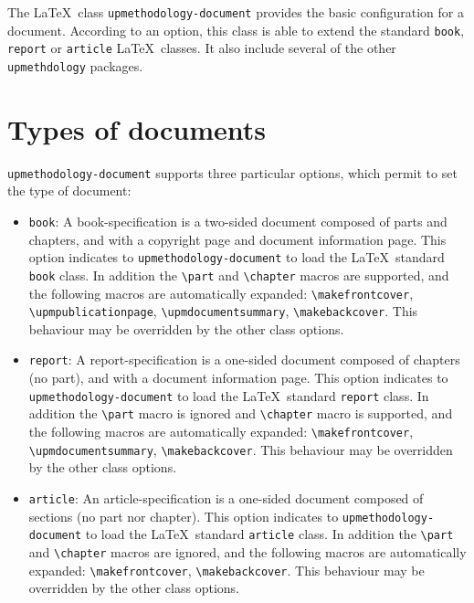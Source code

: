 \documentclass[book]{upmethodology-document}
\begin{document}
The \LaTeX\ class \texttt{upmethodology-document} provides the basic configuration for a document. According to an option, this class is able to extend the standard \texttt{book}, \texttt{report} or \texttt{article} \LaTeX\ classes. It also include several of the other \texttt{upmethdology} packages.

\section{Types of documents}\label{section:documentclass:doctype}

\texttt{upmethodology-document} supports three particular options, which permit to set the type of document:
\begin{itemize}
\item \texttt{book}: A book-specification is a two-sided document composed of parts and chapters, and with a copyright page and document information page. This option indicates to \texttt{upmethodology-document} to load the \LaTeX\ standard \texttt{book} class. In addition the \texttt{{\textbackslash}part} and \texttt{{\textbackslash}chapter} macros are supported, and the following macros are automatically expanded: \texttt{{\textbackslash}makefrontcover}, \texttt{{\textbackslash}upmpublicationpage}, \texttt{{\textbackslash}upmdocumentsummary}, \texttt{{\textbackslash}makebackcover}. This behaviour may be overridden by the other class options.

\item \texttt{report}: A report-specification is a one-sided document composed of chapters (no part), and with a document information page. This option indicates to \texttt{upmethodology-document} to load the \LaTeX\ standard \texttt{report} class. In addition the \texttt{{\textbackslash}part} macro is ignored and \texttt{{\textbackslash}chapter} macro is supported, and the following macros are automatically expanded: \texttt{{\textbackslash}makefrontcover}, \texttt{{\textbackslash}upmdocumentsummary}, \texttt{{\textbackslash}makebackcover}. This behaviour may be overridden by the other class options.

\item \texttt{article}: An article-specification is a one-sided document composed of sections (no part nor chapter). This option indicates to \texttt{upmethodology-document} to load the \LaTeX\ standard \texttt{article} class. In addition the \texttt{{\textbackslash}part} and \texttt{{\textbackslash}chapter} macros are ignored, and the following macros are automatically expanded: \texttt{{\textbackslash}makefrontcover}, \texttt{{\textbackslash}makebackcover}. This behaviour may be overridden by the other class options.

\end{itemize}
\end{document}
